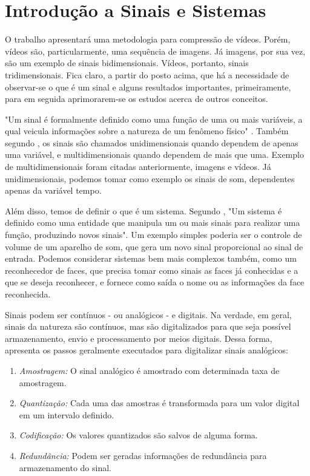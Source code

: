 \documentclass[cic,tc]{iiufrgs}
\begin{document}
\section{Introdução a Sinais e Sistemas}
O trabalho apresentará uma metodologia para compressão de vídeos.
Porém, vídeos são, particularmente, uma sequência de imagens.
Já imagens, por sua vez, são um exemplo de sinais bidimensionais.
Vídeos, portanto, sinais tridimensionais.
Fica claro, a partir do posto acima, que há a necessidade de observar-se 
o que é um sinal e alguns resultados importantes, primeiramente, para 
em seguida aprimorarem-se os estudos acerca de outros conceitos.

"Um sinal é formalmente definido como uma função de uma ou mais variáveis, 
a qual veicula informações sobre a natureza de um fenômeno físico" \cite{haykin2001sinais}.
Também segundo \citet{haykin2001sinais}, os sinais são chamados unidimensionais quando
dependem de apenas uma variável, e multidimensionais quando dependem de mais que uma.
Exemplo de multidimensionais foram citadas anteriormente, imagens e vídeos. 
Já unidimensionais, podemos tomar como exemplo os sinais de som, dependentes apenas da variável tempo.

Além disso, temos de definir o que é um sistema. 
Segundo \citet{haykin2001sinais}, "Um sistema é definido como uma entidade que manipula
um ou mais sinais para realizar uma função, produzindo novos sinais".
Um exemplo simples poderia ser o controle de volume de um aparelho de som,
que gera um novo sinal proporcional ao sinal de entrada.
Podemos considerar sistemas bem mais complexos também, como um reconhecedor 
de faces, que precisa tomar como sinais as faces já conhecidas e a que se 
deseja reconhecer, e fornece como saída o nome ou as informações da face reconhecida.

Sinais podem ser contínuos - ou analógicos - e digitais.
Na verdade, em geral, sinais da natureza são contínuos, mas são digitalizados 
para que seja possível armazenamento, envio e processamento por meios digitais.
Dessa forma, \citet{haykin2001sinais} apresenta os passos geralmente executados 
para digitalizar sinais analógicos:
\begin{enumerate}
    \item \emph{Amostragem:} O sinal analógico é amostrado com determinada taxa de amostragem.
    \item \emph{Quantização:} Cada uma das amostras é transformada para um valor digital em um intervalo definido.
    \item \emph{Codificação:} Os valores quantizados são salvos de alguma forma.
    \item \emph{Redundância:} Podem ser geradas informações de redundância para armazenamento do sinal.
\end{enumerate} 
\end{document}
